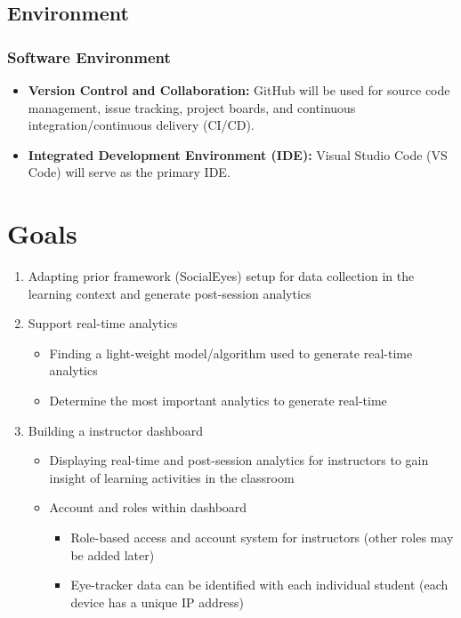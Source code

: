 \documentclass{article}
\begin{document}
\subsection{Environment}

\subsubsection*{Software Environment}

\begin{itemize}
    \item \textbf{Version Control and Collaboration:} GitHub will be used for source code management, issue tracking, project boards, and continuous integration/continuous delivery (CI/CD).
    \item \textbf{Integrated Development Environment (IDE):} Visual Studio Code (VS Code) will serve as the primary IDE.
\end{itemize}

\section{Goals}

  \begin{enumerate}
  \item Adapting prior framework (SocialEyes) setup for data collection in the learning context and generate post-session analytics
  \item Support real-time analytics 
    \begin{itemize}
        \item Finding a light-weight model/algorithm used to generate real-time analytics
        \item Determine the most important analytics to generate real-time
    \end{itemize}
    \item Building a instructor dashboard
        \begin{itemize}
            \item Displaying real-time and post-session analytics for instructors to gain insight of learning activities in the classroom
               \item Account and roles within dashboard
                    \begin{itemize}
                        \item Role-based access and account system for instructors (other roles may be added later)
                        \item Eye-tracker data can be identified with each individual student (each device has a unique IP address)
                    \end{itemize}
        \end{itemize}
  \end{enumerate}
\end{document}
